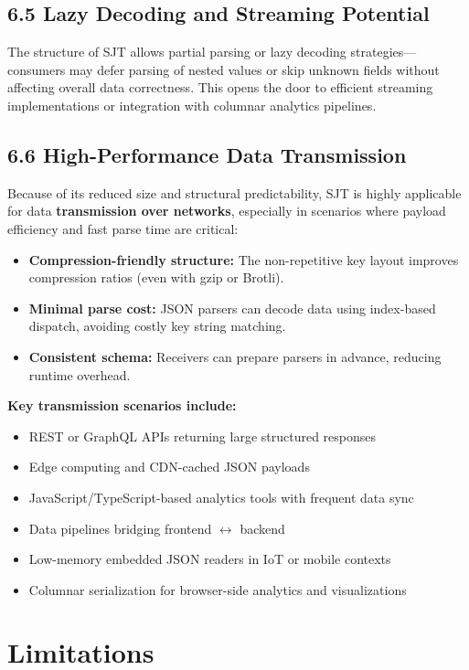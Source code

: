 \documentclass[12pt]{article}
\begin{document}
\subsection*{6.5 Lazy Decoding and Streaming Potential}
The structure of SJT allows partial parsing or lazy decoding strategies---consumers may defer parsing of nested values or skip unknown fields without affecting overall data correctness. This opens the door to efficient streaming implementations or integration with columnar analytics pipelines.

\subsection*{6.6 High-Performance Data Transmission}
Because of its reduced size and structural predictability, SJT is highly applicable for data \textbf{transmission over networks}, especially in scenarios where payload efficiency and fast parse time are critical:

\begin{itemize}
  \item \textbf{Compression-friendly structure:} The non-repetitive key layout improves compression ratios (even with gzip or Brotli).
  \item \textbf{Minimal parse cost:} JSON parsers can decode data using index-based dispatch, avoiding costly key string matching.
  \item \textbf{Consistent schema:} Receivers can prepare parsers in advance, reducing runtime overhead.
\end{itemize}

\textbf{Key transmission scenarios include:}
\begin{itemize}
  \item REST or GraphQL APIs returning large structured responses
  \item Edge computing and CDN-cached JSON payloads
  \item JavaScript/TypeScript-based analytics tools with frequent data sync
  \item Data pipelines bridging frontend $\leftrightarrow$ backend
  \item Low-memory embedded JSON readers in IoT or mobile contexts
  \item Columnar serialization for browser-side analytics and visualizations
\end{itemize}
\section{Limitations}
\end{document}
